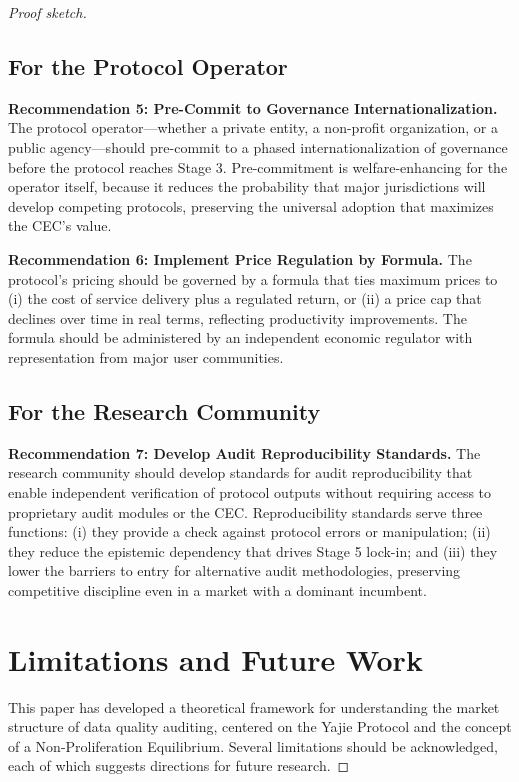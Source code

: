 \documentclass[12pt,a4paper]{ctexart}
\theoremstyle{definition}
\theoremstyle{remark}
\begin{document}
\begin{proof}[Proof sketch]
\subsection{For the Protocol Operator}

\textbf{Recommendation 5: Pre-Commit to Governance Internationalization.} The protocol operator—whether a private entity, a non-profit organization, or a public agency—should pre-commit to a phased internationalization of governance before the protocol reaches Stage 3. Pre-commitment is welfare-enhancing for the operator itself, because it reduces the probability that major jurisdictions will develop competing protocols, preserving the universal adoption that maximizes the CEC's value.

\textbf{Recommendation 6: Implement Price Regulation by Formula.} The protocol's pricing should be governed by a formula that ties maximum prices to (i) the cost of service delivery plus a regulated return, or (ii) a price cap that declines over time in real terms, reflecting productivity improvements. The formula should be administered by an independent economic regulator with representation from major user communities.

\subsection{For the Research Community}

\textbf{Recommendation 7: Develop Audit Reproducibility Standards.} The research community should develop standards for audit reproducibility that enable independent verification of protocol outputs without requiring access to proprietary audit modules or the CEC. Reproducibility standards serve three functions: (i) they provide a check against protocol errors or manipulation; (ii) they reduce the epistemic dependency that drives Stage 5 lock-in; and (iii) they lower the barriers to entry for alternative audit methodologies, preserving competitive discipline even in a market with a dominant incumbent.

\section{Limitations and Future Work}

This paper has developed a theoretical framework for understanding the market structure of data quality auditing, centered on the Yajie Protocol and the concept of a Non-Proliferation Equilibrium. Several limitations should be acknowledged, each of which suggests directions for future research.


\end{proof}
\end{document}
